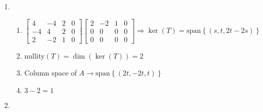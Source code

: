 \documentclass[12pt]{article}
\begin{document}
\begin{enumerate}
\begin{enumerate}
    \end{enumerate}

    \setcounter{enumi}{26}

  \item

    \begin{enumerate}

      \item $\left[ \begin{array}{ccc|c} 4 & -4 & 2 & 0\\ -4 & 4 & 2 & 0\\ 2 & -2 & 1 & 0  \end{array} \right]\widetilde{ }\left[ \begin{array}{ccc|c} 2 & -2 & 1 & 0\\ 0 & 0 & 0 & 0\\ 0 & 0 & 0 & 0  \end{array} \right]\Rightarrow\ker(T)=\text{span}\left\{ (s,t,2t-2s) \right\}$

      \item nullity$(T)=\dim(\ker(T))=2$

      \item Column space of $A\rightarrow\text{span}\left\{ (2t,-2t,t) \right\}$

      \item $3-2=1$

    \end{enumerate}

    \setcounter{enumi}{30}

  \item

    \begin{enumerate}


\end{enumerate}
\end{enumerate}
\end{document}
